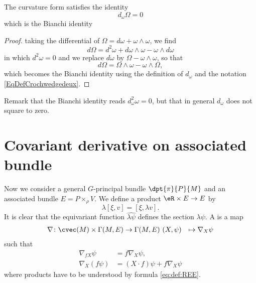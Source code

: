 \begin{proposition}
The curvature form satisfies the identity
\begin{equation}
d_{\omega}\Omega=0
\end{equation}
which is the Bianchi identity
\end{proposition}

\begin{proof}
taking the differential of $\Omega=d\omega+\omega\wedge\omega$, we find
\[ 
  d\Omega=d^2\omega+d\omega\wedge\omega-\omega\wedge d\omega
\]
in which $d^2\omega=0$ and we replace $d\omega$ by $\Omega-\omega\wedge\omega$, so that
\[ 
  d\Omega=\Omega\wedge\omega-\omega\wedge\Omega,
\]
which becomes the Bianchi identity using the definition of $d_{\omega}$ and the notation \eqref{EqDefCrochwedgedeux}.
\end{proof}
Remark that the Bianchi identity reads $d_{\omega}^2\omega=0$, but that in general $d_{\omega}$ does not square to zero. 

\section{Covariant derivative on associated bundle}

Now we consider a general $G$-principal bundle $\dpt{\pi}{P}{M}$ and an associated bundle $E=P\times_{\rho} V$. We define a product $\eR\times E\to E$ by
\begin{equation}\label{eq:def:REE}
  \lambda[\xi,v]=[\xi,\lambda v].
\end{equation}
It is clear that the equivariant function $\widehat{\lambda \psi}$ defines the section $\lambda\psi$. A  is a map 
		\begin{equation}
		\begin{aligned}
			\nabla \colon \cvec(M)\times \Gamma(M,E) &\to \Gamma(M,E)\
			(X,\psi)&\mapsto \nabla_X\psi
		\end{aligned}
	\end{equation}	
such that 
\begin{subequations}
\begin{align}
\nabla_{fX}\psi&=f\nabla_X\psi,   \\
\nabla_X(f\psi)&=(X\cdot f)\psi+f\nabla_X\psi                                      \label{eq:def:der_covii}
\end{align}
\end{subequations}
where products have to be understood by formula \eqref{eq:def:REE}.


